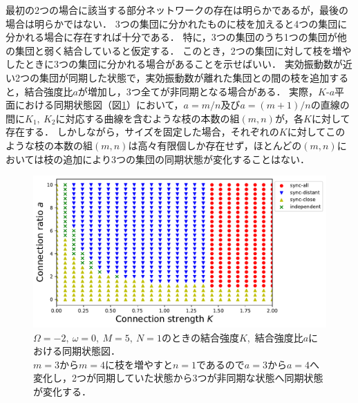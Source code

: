 \documentclass[../main]{subfiles}
\begin{document}
最初の2つの場合に該当する部分ネットワークの存在は明らかであるが，最後の場合は明らかではない．
3つの集団に分かれたものに枝を加えると4つの集団に分かれる場合に存在すれば十分である．
特に，3つの集団のうち1つの集団が他の集団と弱く結合していると仮定する．
このとき，2つの集団に対して枝を増やしたときに3つの集団に分かれる場合があることを示せばいい．
実効振動数が近い2つの集団が同期した状態で，実効振動数が離れた集団との間の枝を追加すると，結合強度比$a$が増加し，3つ全てが非同期となる場合がある．
実際，$K$-$a$平面における同期状態図（図\ref{fig:3body-phase-m5}）において，$a=m/n$及び$a=(m+1)/n$の直線の間に$K_1,\ K_2$に対応する曲線を含むような枝の本数の組$(m,n)$が，各$K$に対して存在する．
しかしながら，サイズを固定した場合，それぞれの$K$に対してこのような枝の本数の組$(m,n)$は高々有限個しか存在せず，ほとんどの$(m,n)$においては枝の追加により3つの集団の同期状態が変化することはない．
\begin{figure}[tbp]
    \centering
    \includegraphics[width=135mm]{./images/three-body-phase-m5.pdf}
    \centering
    \caption{$\Omega=-2,\ \omega=0,\ M=5,\ N=1$のときの結合強度$K$,\ 結合強度比$a$における同期状態図．\\
    $m=3$から$m=4$に枝を増やすと$n=1$であるので$a=3$から$a=4$へ変化し，2つが同期していた状態から3つが非同期な状態へ同期状態が変化する．}
    \label{fig:3body-phase-m5}
\end{figure}

\end{document}
